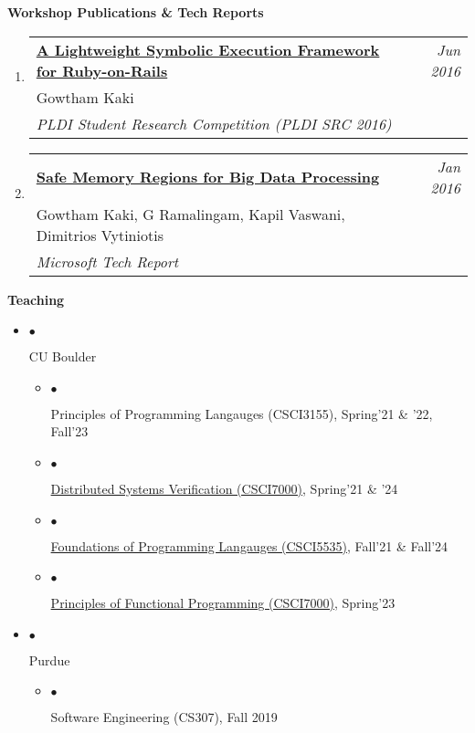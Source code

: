 \documentclass[10pt]{article}
\makeatletter
\newcommand{\lbar}[1]{{\color{#1}\ding{118}}\hspace*{2pt}}
\newenvironment{benumerate}[2]{
    \let\oldItem\item
    \def\item{\addtocounter{enumi}{-2}\oldItem}
    \begin{enumerate}[#2] \itemsep3pt
    \setcounter{enumi}{#1}
    \addtocounter{enumi}{1}}
  {\end{enumerate}}
\newcommand{\service}[1]{\item $\bullet$ \hspace{1ex}\parbox{7.2in}{#1}}
\newenvironment{publication}[5]
{ \item
  \begin{tabular*}{7.5in}{p{6.3in}@{\extracolsep{\fill}}r}
    \href{#1}{\textbf{#2}} & \textit{#3}\\ #4 &\\ \textit{#5}&\\
  \end{tabular*}
} {}
\newenvironment{region}[3]{%
  \vspace*{0.5ex}
  {{\textbf{\large{#1}}}}
  \begin{benumerate}{#3}{\color{RoyalBlue}#2}}
  {\end{benumerate}\vspace{0.8ex}}
\newenvironment{itemregion}[1]{
  \vspace*{0.5ex}
  {{\textbf{\large{#1}}}}
  \begin{itemize}\itemsep1pt}
  {\end{itemize}\vspace{0.8ex}}
\makeatother
\begin{document}
\begin{region} {\lbar{Mahogany}Workshop Publications \& Tech Reports}{{W}1}{5}
  \begin{publication}{http://purduepl.github.io/docs/maglev.pdf}
    {A Lightweight Symbolic Execution Framework for Ruby-on-Rails}
    {Jun 2016}{Gowtham Kaki} {PLDI Student Research Competition (PLDI SRC 2016)}
  \end{publication}

  \begin{publication}{https://www.microsoft.com/en-us/research/publication/safe-memory-regions-big-data-processing}
    {Safe Memory Regions for Big Data Processing}
    {Jan 2016}{Gowtham Kaki, G Ramalingam, Kapil Vaswani, Dimitrios
    Vytiniotis} {Microsoft Tech Report}
  \end{publication}

\end{region}

\begin{itemregion}{\lbar{Mahogany}Teaching}
  \service{CU Boulder}
  \begin{itemize}
    \service{Principles of Programming Langauges (CSCI3155), Spring'21 \& '22, Fall'23}
    \service{\href{https://gowthamk.github.io/csci7000_s21/}{Distributed Systems Verification (CSCI7000)}, Spring'21 \& '24}
    \service{\href{https://csci5535.github.io/}{Foundations of
    Programming Langauges (CSCI5535)}, Fall'21 \& Fall'24}
    \service{\href{https://gowthamk.github.io/csci7000_pfp_s23/}{Principles of Functional Programming (CSCI7000)}, Spring'23}
  \end{itemize}
  \service{Purdue}
  \begin{itemize}
    \service{Software Engineering (CS307), Fall 2019}
  \end{itemize}
\end{itemregion}
\end{document}
